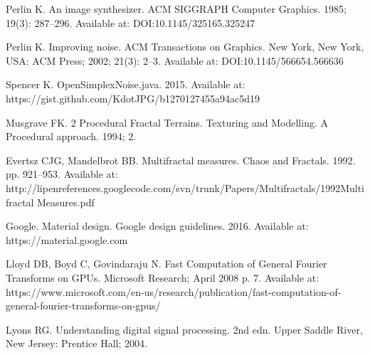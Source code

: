 Perlin K. An image synthesizer. ACM SIGGRAPH Computer Graphics. 1985; 19(3): 287--296. Available at: DOI:10.1145/325165.325247

Perlin K. Improving noise. ACM Transactions on Graphics. New York, New York, USA: ACM Press; 2002; 21(3): 2--3. Available at: DOI:10.1145/566654.566636

Spencer K. OpenSimplexNoise.java. 2015. Available at: https://gist.github.com/KdotJPG/b1270127455a94ac5d19

Musgrave FK. 2 Procedural Fractal Terrains. Texturing and Modelling. A Procedural approach. 1994;  2.

Evertsz CJG, Mandelbrot BB. Multifractal measures. Chaos and Fractals. 1992. pp. 921--953. Available at: http://lipenreferences.googlecode.com/svn/trunk/Papers/Multifractals/1992Multifractal Measures.pdf

Google. Material design. Google design guidelines. 2016. Available at: https://material.google.com

Lloyd DB, Boyd C, Govindaraju N. Fast Computation of General Fourier Transforms on GPUs. Microsoft Research; April 2008 p. 7. Available at: https://www.microsoft.com/en-us/research/publication/fast-computation-of-general-fourier-transforms-on-gpus/

Lyons RG. Understanding digital signal processing. 2nd edn. Upper Saddle River, New Jersey: Prentice Hall; 2004.

